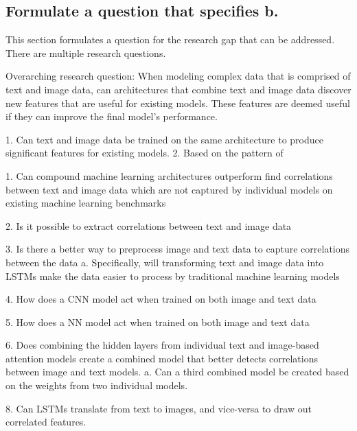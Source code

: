 \subsection{Formulate a question that specifies b.}

This section formulates a question for the research gap that can be addressed.  There are multiple research questions.




Overarching research question: When modeling complex data that is comprised of text and image data, can architectures that combine text and image data discover new features that are useful for existing models.  These features are deemed useful if they can improve the final model's performance.

1. Can text and image data be trained on the same architecture to produce significant features for existing models.
2. Based on the pattern of 


1. Can compound machine learning architectures outperform find correlations between text and image data which are not captured by individual models on existing machine learning benchmarks

2. Is it possible to extract correlations between text and image data  %

3. Is there a better way to preprocess image and text data to capture correlations between the data%
a. Specifically, will transforming text and image data into LSTMs make the data easier to process by traditional machine learning models

4. How does a CNN model act when trained on both image and text data  %

5. How does a NN model act when trained on both image and text data

6. Does combining the hidden layers from individual text and image-based attention models create a combined model that better detects correlations between image and text models.
    a. Can a third combined model be created based on the weights from two individual models.

8. Can LSTMs translate from text to images, and vice-versa to draw out correlated features.
